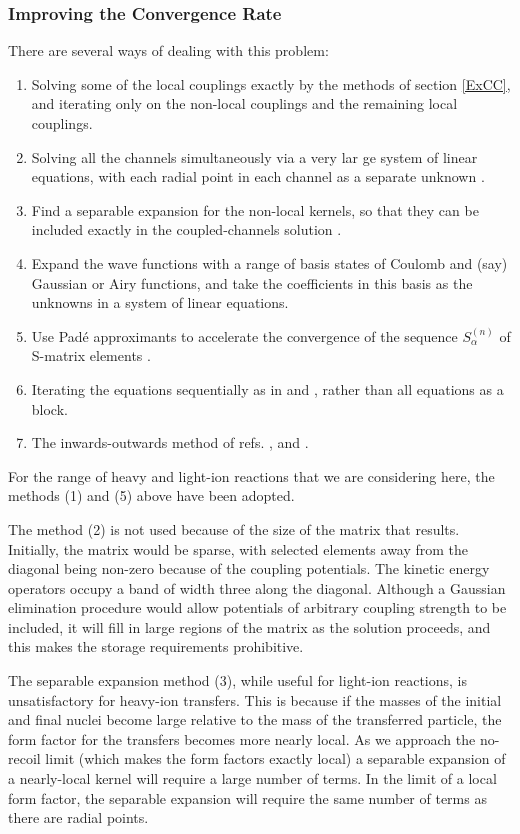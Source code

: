 \documentclass[11pt,a4paper]{article}
\begin{document}
\subsubsection{Improving the Convergence Rate}

There are several ways of dealing with this problem:
\begin{enumerate}
\item Solving some of the local couplings exactly by the methods of section \ref{ExCC},
and iterating only on the non-local couplings and the remaining
local couplings.
\item
Solving all the channels simultaneously via a very lar ge system of linear equations,
with each radial point in each channel as a separate unknown
\cite{bang83}.
\item
Find a separable expansion for the non-local kernels,
so that they can be included exactly in the coupled-channels solution \cite{PHD}.
\item
Expand the wave functions with a range of basis states
of Coulomb and (say) Gaussian \cite{KAWAI} or Airy \cite{PIECAN}
functions, and take the coefficients in this basis as the unknowns in a system of
linear equations.
\item
Use Pad\'e approximants to accelerate the convergence of the sequence
$S^{(n)} _\alpha $ of S-matrix elements \cite{ECIS1,ptolemy}.
\item Iterating the equations sequentially
as in \cite{ECIS1} and \cite{ptolemy}, rather than all equations as a block.
\item The inwards-outwards method of refs. \cite{ald77}, \cite{ichi0000}
and \cite{TOLSMA2}.
\end{enumerate}
For the range of heavy and light-ion reactions that we are considering here,
the methods (1) and (5) above have been adopted.

The method (2) is not used because of the size of the matrix that results.
Initially, the matrix would be sparse, with selected elements away from the
diagonal being non-zero because of the coupling potentials.
The kinetic energy operators occupy a band of width three along
the diagonal. Although a Gaussian elimination procedure
would allow potentials of arbitrary coupling strength to be included,
it will fill in large regions of the matrix as the solution proceeds,
and this makes the storage requirements prohibitive.

The separable expansion method (3), while useful for light-ion reactions,
is unsatisfactory for heavy-ion transfers. This is because if the
masses of the initial and final nuclei become large relative
to the mass of the transferred particle,
the form factor for the transfers becomes more nearly local.
As we approach the no-recoil limit (which makes the form factors exactly local)
a separable expansion of a nearly-local kernel will require
a large number of terms.  In the limit of a local form factor,
the separable expansion will require the same number of terms
as there are radial points.
\end{document}
